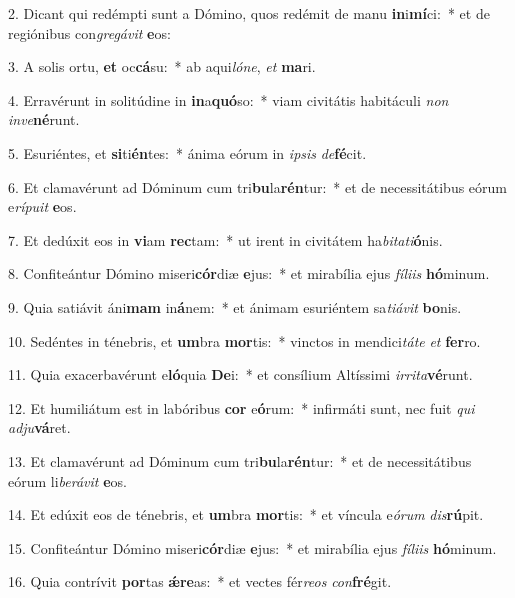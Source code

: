 2. Dicant qui redémpti sunt a Dómino, quos redémit de manu \textbf{in}i\textbf{mí}ci:~*  et de regiónibus con\textit{gre}\textit{gá}\textit{vit} \textbf{e}os:\

3. A solis ortu, \textbf{et} oc\textbf{cá}su:~*  ab aqui\textit{ló}\textit{ne}, \textit{et} \textbf{ma}ri.\

4. Erravérunt in solitúdine in \textbf{in}a\textbf{quó}so:~*  viam civitátis habitáculi \textit{non} \textit{in}\textit{ve}\textbf{né}runt.\

5. Esuriéntes, et \textbf{si}ti\textbf{én}tes:~*  ánima eórum in \textit{ip}\textit{sis} \textit{de}\textbf{fé}cit.\

6. Et clamavérunt ad Dóminum cum tri\textbf{bu}la\textbf{rén}tur:~*  et de necessitátibus eórum e\textit{rí}\textit{pu}\textit{it} \textbf{e}os.\

7. Et dedúxit eos in \textbf{vi}am \textbf{rec}tam:~*  ut irent in civitátem ha\textit{bi}\textit{ta}\textit{ti}\textbf{ó}nis.\

8. Confiteántur Dómino miseri\textbf{cór}diæ \textbf{e}jus:~*  et mirabília ejus \textit{fí}\textit{li}\textit{is} \textbf{hó}minum.\

9. Quia satiávit áni\textbf{mam} in\textbf{á}nem:~*  et ánimam esuriéntem sa\textit{ti}\textit{á}\textit{vit} \textbf{bo}nis.\

10. Sedéntes in ténebris, et \textbf{um}bra \textbf{mor}tis:~*  vinctos in mendici\textit{tá}\textit{te} \textit{et} \textbf{fer}ro.\

11. Quia exacerbavérunt e\textbf{ló}quia \textbf{De}i:~*  et consílium Altíssimi \textit{ir}\textit{ri}\textit{ta}\textbf{vé}runt.\

12. Et humiliátum est in labóribus \textbf{cor} e\textbf{ó}rum:~*  infirmáti sunt, nec fuit \textit{qui} \textit{ad}\textit{ju}\textbf{vá}ret.\

13. Et clamavérunt ad Dóminum cum tri\textbf{bu}la\textbf{rén}tur:~*  et de necessitátibus eórum li\textit{be}\textit{rá}\textit{vit} \textbf{e}os.\

14. Et edúxit eos de ténebris, et \textbf{um}bra \textbf{mor}tis:~*  et víncula e\textit{ó}\textit{rum} \textit{dis}\textbf{rú}pit.\

15. Confiteántur Dómino miseri\textbf{cór}diæ \textbf{e}jus:~*  et mirabília ejus \textit{fí}\textit{li}\textit{is} \textbf{hó}minum.\

16. Quia contrívit \textbf{por}tas \textbf{ǽ}\textbf{re}as:~*  et vectes fér\textit{re}\textit{os} \textit{con}\textbf{fré}git.\

